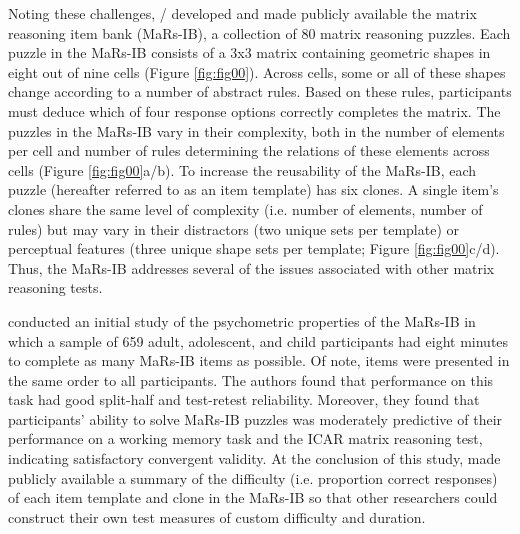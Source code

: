 \documentclass[a4paper,man,natbib]{apa6}
\begin{document}
Noting these challenges, \cite{knoll2016window} / \cite{chierchia2019matrix} developed and made publicly available the matrix reasoning item bank (MaRs-IB), a collection of 80 matrix reasoning puzzles. Each puzzle in the MaRs-IB consists of a 3x3 matrix containing geometric shapes in eight out of nine cells (Figure \ref{fig:fig00}). Across cells, some or all of these shapes change according to a number of abstract rules. Based on these rules, participants must deduce which of four response options correctly completes the matrix. The puzzles in the MaRs-IB vary in their complexity, both in the number of elements per cell and number of rules determining the relations of these elements across cells (Figure \ref{fig:fig00}a/b). To increase the reusability of the MaRs-IB, each puzzle (hereafter referred to as an item template) has six clones. A single item's clones share the same level of complexity (i.e. number of elements, number of rules) but may vary in their distractors (two unique sets per template) or perceptual features (three unique shape sets per template; Figure \ref{fig:fig00}c/d). Thus, the MaRs-IB addresses several of the issues associated with other matrix reasoning tests.   

\cite{chierchia2019matrix} conducted an initial study of the psychometric properties of the MaRs-IB in which a sample of 659 adult, adolescent, and child participants had eight minutes to complete as many MaRs-IB items as possible. Of note, items were presented in the same order to all participants. The authors found that performance on this task had good split-half and test-retest reliability. Moreover, they found that participants' ability to solve MaRs-IB puzzles was moderately predictive of their performance on a working memory task and the ICAR matrix reasoning test, indicating satisfactory convergent validity. At the conclusion of this study, \cite{chierchia2019matrix} made publicly available a summary of the difficulty (i.e. proportion correct responses) of each item template and clone in the MaRs-IB so that other researchers could construct their own test measures of custom difficulty and duration.
\end{document}
